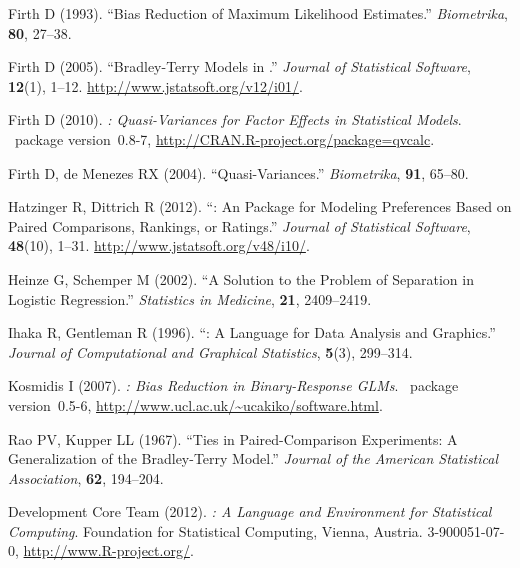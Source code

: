 \begin{thebibliography}{22}
Firth D (1993).
\newblock \enquote{Bias Reduction of Maximum Likelihood Estimates.}
\newblock \emph{Biometrika}, \textbf{80}, 27--38.

Firth D (2005).
\newblock \enquote{Bradley-Terry Models in .}
\newblock \emph{Journal of Statistical Software}, \textbf{12}(1), 1--12.
\newblock \urlprefix\url{http://www.jstatsoft.org/v12/i01/}.

Firth D (2010).
\newblock \emph{: Quasi-Variances for Factor Effects in Statistical
  Models}.
\newblock {}~package version~0.8-7,
  \urlprefix\url{http://CRAN.R-project.org/package=qvcalc}.

Firth D, {de Menezes} RX (2004).
\newblock \enquote{Quasi-Variances.}
\newblock \emph{Biometrika}, \textbf{91}, 65--80.

Hatzinger R, Dittrich R (2012).
\newblock \enquote{: An  Package for Modeling
  Preferences Based on Paired Comparisons, Rankings, or Ratings.}
\newblock \emph{Journal of Statistical Software}, \textbf{48}(10), 1--31.
\newblock \urlprefix\url{http://www.jstatsoft.org/v48/i10/}.

Heinze G, Schemper M (2002).
\newblock \enquote{A Solution to the Problem of Separation in Logistic
  Regression.}
\newblock \emph{Statistics in Medicine}, \textbf{21}, 2409--2419.

Ihaka R, Gentleman R (1996).
\newblock \enquote{: A Language for Data Analysis and Graphics.}
\newblock \emph{Journal of Computational and Graphical Statistics},
  \textbf{5}(3), 299--314.

Kosmidis I (2007).
\newblock \emph{: Bias Reduction in Binary-Response GLMs}.
\newblock {}~package version~0.5-6,
  \urlprefix\url{http://www.ucl.ac.uk/~ucakiko/software.html}.

Rao PV, Kupper LL (1967).
\newblock \enquote{Ties in Paired-Comparison Experiments: {A} Generalization of
  the {B}radley-{T}erry Model.}
\newblock \emph{Journal of the American Statistical Association}, \textbf{62},
  194--204.

{ Development Core Team} (2012).
\newblock \emph{: A Language and Environment for Statistical
  Computing}.
\newblock {} Foundation for Statistical Computing, Vienna, Austria.
 3-900051-07-0, \urlprefix\url{http://www.R-project.org/}.


\end{thebibliography}
